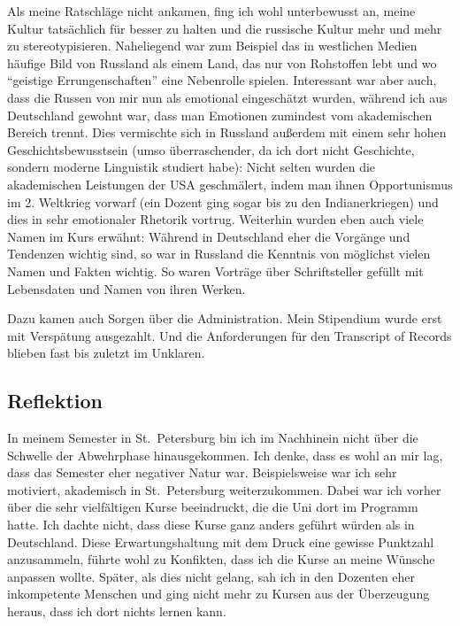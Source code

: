 \documentclass{../../sem_paper}
\begin{document}
Als meine Ratschläge nicht ankamen, fing ich wohl unterbewusst an, meine Kultur tatsächlich für besser zu halten und die russische Kultur mehr und mehr zu stereotypisieren. Naheliegend war zum Beispiel das in westlichen Medien häufige Bild von Russland als einem Land, das nur von Rohstoffen lebt und wo “geistige Errungenschaften” eine Nebenrolle spielen. Interessant war aber auch, dass die Russen von mir nun als emotional eingeschätzt wurden, während ich aus Deutschland gewohnt war, dass man Emotionen zumindest vom akademischen Bereich trennt. Dies vermischte sich in Russland außerdem mit einem sehr hohen Geschichtsbewusstsein (umso überraschender, da ich dort nicht Geschichte, sondern moderne Linguistik studiert habe): Nicht selten wurden die akademischen Leistungen der USA geschmälert, indem man ihnen Opportunismus im 2. Weltkrieg vorwarf (ein Dozent ging sogar bis zu den Indianerkriegen) und dies in sehr emotionaler Rhetorik vortrug. Weiterhin wurden eben auch viele Namen im Kurs erwähnt: Während in Deutschland eher die Vorgänge und Tendenzen wichtig sind, so war in Russland die Kenntnis von möglichst vielen Namen und Fakten wichtig. So waren Vorträge über Schriftsteller gefüllt mit Lebensdaten und Namen von ihren Werken.

Dazu kamen auch Sorgen über die Administration. Mein Stipendium wurde erst mit Verspätung ausgezahlt. Und die Anforderungen für den Transcript of Records blieben fast bis zuletzt im Unklaren.

\subsection*{Reflektion}

In meinem Semester in St.\ Petersburg bin ich im Nachhinein nicht über die Schwelle der Abwehrphase hinausgekommen. Ich denke, dass es wohl an mir lag, dass das Semester eher negativer Natur war. Beispielsweise war ich sehr motiviert, akademisch in St.\ Petersburg weiterzukommen. Dabei war ich vorher über die sehr vielfältigen Kurse beeindruckt, die die Uni dort im Programm hatte. Ich dachte nicht, dass diese Kurse ganz anders geführt würden als in Deutschland. Diese Erwartungshaltung mit dem Druck eine gewisse Punktzahl anzusammeln, führte wohl zu Konfikten, dass ich die Kurse an meine Wünsche anpassen wollte. Später, als dies nicht gelang, sah ich in den Dozenten eher inkompetente Menschen und ging nicht mehr zu Kursen aus der Überzeugung heraus, dass ich dort nichts lernen kann.
\end{document}
